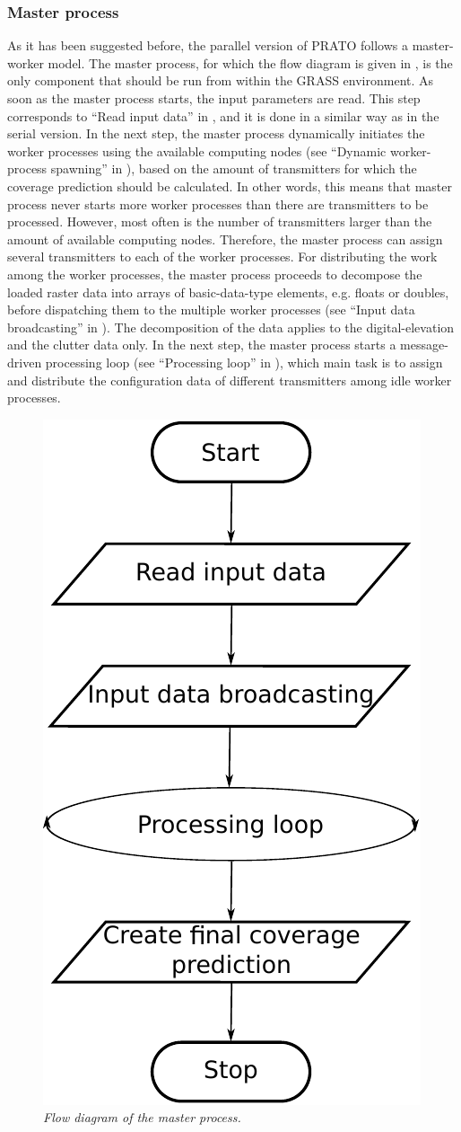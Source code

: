 \subsubsection{Master process\label{sub:Master-process}}

As it has been suggested before, the parallel version of PRATO follows
a master-worker model. The master process, for which the flow diagram
is given in , is the only component
that should be run from within the GRASS environment. As soon as the
master process starts, the input parameters are read. This step corresponds
to ``Read input data'' in , and it
is done in a similar way as in the serial version. In the next step,
the master process dynamically initiates the worker processes using
the available computing nodes (see ``Dynamic worker-process spawning''
in ), based on the amount of transmitters
for which the coverage prediction should be calculated. In other words,
this means that master process never starts more worker processes
than there are transmitters to be processed. However, most often is
the number of transmitters larger than the amount of available computing
nodes. Therefore, the master process can assign several transmitters
to each of the worker processes. For distributing the work among the
worker processes, the master process proceeds to decompose the loaded
raster data into arrays of basic-data-type elements, e.g. floats or
doubles, before dispatching them to the multiple worker processes
(see ``Input data broadcasting'' in ).
The decomposition of the data applies to the digital-elevation and
the clutter data only. In the next step, the master process starts
a message-driven processing loop (see ``Processing loop'' in ),
which main task is to assign and distribute the configuration data
of different transmitters among idle worker processes.

\begin{figure}
\centering

\includegraphics[width=0.4\columnwidth]{04-framework_design_and_implementation/img/master_process_flow_diagram}

\caption{\textit{\emph{Flow diagram of the master process.\label{fig:master_process}}}}
\end{figure}


